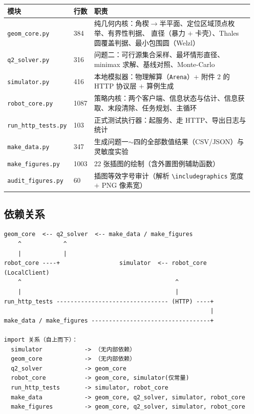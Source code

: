 \begin{center}
\begin{tabular}{llp{7.6cm}}
\toprule
模块 & 行数 & 职责 \\ \midrule
\texttt{geom\_core.py} & 384 & 纯几何内核：角楔$\to$半平面、定位区域顶点枚举、有界性判据、
直径（暴力 $+$ 卡壳）、Thales 圆覆盖判据、最小包围圆（Welzl） \\
\texttt{q2\_solver.py} & 316 & 问题二：可行源集合采样、最坏情形直径、minimax 求解、基线对照、Monte-Carlo \\
\texttt{simulator.py} & 416 & 本地模拟器：物理解算（\texttt{Arena}）$+$ 附件 2 的 HTTP 协议层 $+$ 算例生成 \\
\texttt{robot\_core.py} & 1087 & 策略内核：两个客户端、信息状态与估计、信息获取、末段清除、任务规划、主循环 \\
\texttt{run\_http\_tests.py} & 103 & 正式测试执行器：起服务、走 HTTP、导出日志与统计 \\
\texttt{make\_data.py} & 347 & 生成问题一$\sim$四的全部数值结果（CSV/JSON）与灵敏度实验 \\
\texttt{make\_figures.py} & 1003 & 22 张插图的绘制（含外置图例辅助函数） \\
\texttt{audit\_figures.py} & 60 & 插图等效字号审计（解析 \texttt{\textbackslash includegraphics} 宽度 $+$ PNG 像素宽） \\
\bottomrule
\end{tabular}
\end{center}

\subsection{依赖关系}

\begin{lstlisting}[caption={模块依赖（箭头表示 import）}]
geom_core  <-- q2_solver  <-- make_data / make_figures
    ^            ^
    |            |
robot_core ----+                 simulator  <-- robot_core (LocalClient)
    ^                                            ^
    |                                            |
run_http_tests -------------------------------- (HTTP) ----+
                                                           |
make_data / make_figures ----------------------------------+

import 关系（自上而下）：
  simulator            -> （无内部依赖）
  geom_core            -> （无内部依赖）
  q2_solver            -> geom_core
  robot_core           -> geom_core, simulator(仅常量)
  run_http_tests       -> simulator, robot_core
  make_data            -> geom_core, q2_solver, simulator, robot_core
  make_figures         -> geom_core, q2_solver, simulator, robot_core
\end{lstlisting}

